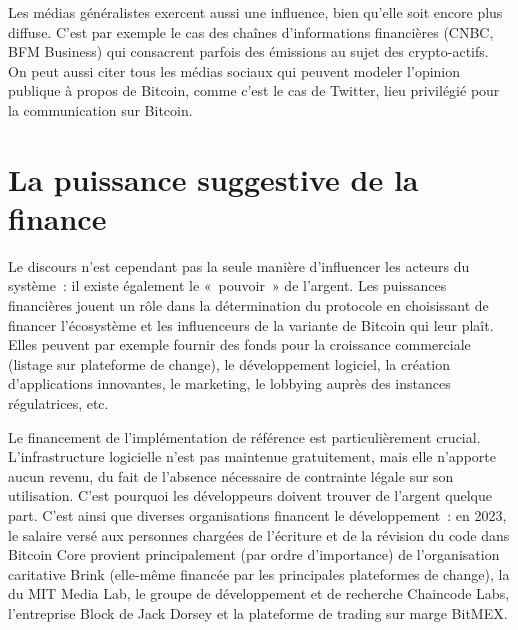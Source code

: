 Les médias généralistes exercent aussi une influence, bien qu'elle soit encore plus diffuse. C'est par exemple le cas des chaînes d'informations financières (CNBC, BFM Business) qui consacrent parfois des émissions au sujet des crypto-actifs. On peut aussi citer tous les médias sociaux qui peuvent modeler l'opinion publique à propos de Bitcoin, comme c'est le cas de Twitter, lieu privilégié pour la communication sur Bitcoin.

\section*{La puissance suggestive de la finance} %

Le discours n'est cependant pas la seule manière d'influencer les acteurs du système~: il existe également le «~pouvoir~» de l'argent. Les puissances financières jouent un rôle dans la détermination du protocole en choisissant de financer l'écosystème et les influenceurs de la variante de Bitcoin qui leur plaît. Elles peuvent par exemple fournir des fonds pour la croissance commerciale (listage sur plateforme de change), le développement logiciel, la création d'applications innovantes, le marketing, le lobbying auprès des instances régulatrices, etc.

Le financement de l'implémentation de référence est particulièrement crucial. L'infrastructure logicielle n'est pas maintenue gratuitement, mais elle n'apporte aucun revenu, du fait de l'absence nécessaire de contrainte légale sur son utilisation. C'est pourquoi les développeurs doivent trouver de l'argent quelque part. C'est ainsi que diverses organisations financent le développement~: en 2023, le salaire versé aux personnes chargées de l'écriture et de la révision du code dans Bitcoin Core provient principalement (par ordre d'importance) de l'organisation caritative Brink (elle-même financée par les principales plateformes de change), la  du MIT Media Lab, le groupe de développement et de recherche Chaincode Labs, l'entreprise Block de Jack Dorsey et la plateforme de trading sur marge BitMEX.

